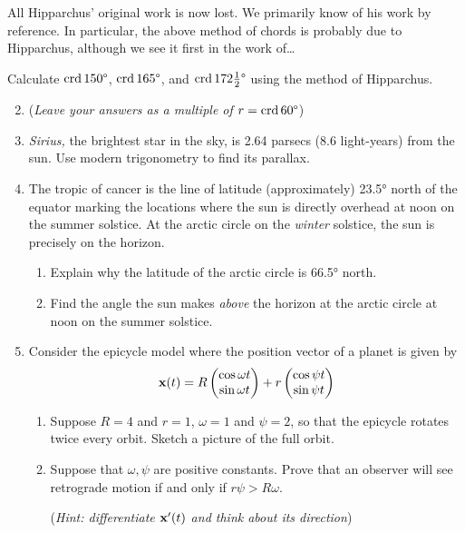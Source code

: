 All Hipparchus' original work is now lost. We primarily know of his work by reference. In particular, the above method of chords is probably due to Hipparchus, although we see it first in the work of\ldots



\begin{exercises}{}{}
	\exstart %
	  Calculate $\crd\ang{150}$, $\crd\ang{165}$, and $\crd\ang{172\tfrac 12}$ using the method of Hipparchus.\vspace{-5pt}
	\begin{enumerate}\setcounter{enumi}{1}
	  \item[](\emph{Leave your answers as a multiple of $r=\crd\ang{60}$})
	  
	  \item \emph{Sirius,} the brightest star in the sky, is 2.64 parsecs (8.6 light-years) from the sun. Use modern trigonometry to find its parallax.
	
		\item\label{exs:tropicstick1} The tropic of cancer is the line of latitude (approximately) \ang{23.5} north of the equator marking the locations where the sun is directly overhead at noon on the summer solstice.\footnotemark{} At the arctic circle on the \emph{winter} solstice, the sun is precisely on the horizon.
		\begin{enumerate}
		  \item Explain why the latitude of the arctic circle is \ang{66.5} north.
		  \item Find the angle the sun makes \emph{above} the horizon at the arctic circle at noon on the summer solstice.
		\end{enumerate}
	  
	  \item Consider the epicycle model where the position vector of a planet is given by
	  \[
	  	\vx(t)=R\twovec{\cos \omega t}{\sin \omega t}+r\twovec{\cos \psi t}{\sin \psi t}
	  \]
	  \begin{enumerate}
	    \item Suppose $R=4$ and $r=1$, $\omega=1$ and $\psi=2$, so that the epicycle rotates twice every orbit. Sketch a picture of the full orbit.
	    \item Suppose that $\omega,\psi$ are positive constants. Prove that an observer will see retrograde motion if and only if $r\psi>R\omega$.\par
	  	(\emph{Hint: differentiate $\vx'(t)$ and think about its direction})
	  \end{enumerate}
	\end{enumerate}
\end{exercises}

